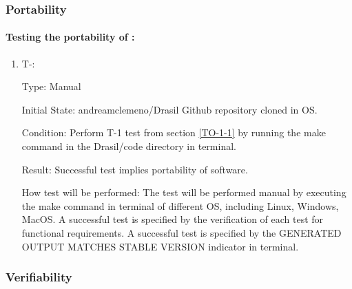\documentclass[12pt, titlepage]{article}
\newcounter{tinnum} %
\begin{document}
\subsubsection{Portability} \label{nonfunc_portability}

\paragraph{Testing the portability of \progname{}:}

\begin{enumerate}

\item{T-}\thetinnum\label{T-12}:

Type: Manual
					
Initial State: andreamclemeno/Drasil Github repository cloned in OS.
					
Condition: Perform T-1 test from section \ref{TO-1-1} by running the make command in the Drasil/code directory in terminal.
					
Result: Successful test implies portability of software.

How test will be performed: The test will be performed manual by executing the 
make command in terminal of different OS, including Linux, Windows, MacOS.  A successful test is specified by the verification of each test for functional requirements. A successful test is specified by the GENERATED OUTPUT MATCHES STABLE VERSION indicator in terminal.
					
\end{enumerate}

\subsubsection{Verifiability}
		
\end{document}
